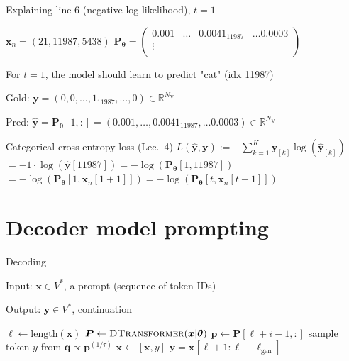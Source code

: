 \documentclass[12pt,aspectratio=169,handout]{beamer}
\begin{document}
\begin{frame}{Explaining line 6 (negative log likelihood), $t = 1$}
	
	\begin{small}
		$\bm{x}_n = (21, 11987, 5438)$
		$
		\bm{P_{\theta}} =
		\begin{pmatrix}
			0.001 & \ldots & 0.0041_{11987} & \ldots 0.0003 \\
			\vdots &  &  &  \\
		\end{pmatrix}
		$
	\end{small}	
	
	For $t = 1$, the model should learn to predict "cat" (idx 11987)
	
	Gold: $\bm{y} = (0, 0, \ldots, 1_{11987}, \ldots, 0) \in \mathbb{R}^{N_{\text{V}}}$
	
	Pred: $\bm{\hat{y}} = \bm{P_{\theta}}[1,:] = (0.001, \ldots, 0.0041_{11987}, \ldots 0.0003) \in \mathbb{R}^{N_{\text{V}}}$
	
	\begin{block}{Categorical cross entropy loss (Lec.\ 4)}
		$L (\bm{\hat{y}, \bm{y}}) := - \sum_{k = 1}^{K} \bm{y}_{[k]} \log \left(  \bm{\hat{y}}_{[k]} \right)$ \\
		$= - 1 \cdot \log (\bm{\hat{y}}[11987])
		= - \log(\bm{P_{\theta}}[1, 11987])$ \\
		$= - \log(\bm{P_{\theta}}[1, \bm{x}_n[1 + 1]]) 
		= - \log(\bm{P_{\theta}}[t, \bm{x}_n[t + 1]])$	
	\end{block}
	
\end{frame}


\section{Decoder model prompting}

\begin{frame}{Decoding}

Input: $\bm{x} \in V^*$, a prompt (sequence of token IDs)

Output: $\bm{y} \in V^*$, continuation

\begin{minipage}[t][10cm][t]{15cm}
	\begin{algorithmic}[1]
		\State $\ell \gets \text{length}(\bm{x})$
		\State $\bm{P} \gets \textsc{DTransformer}(\bm{x} | \bm{\theta})$
		\State $\bm{p} \gets \bm{P}[\ell + i - 1, :]$
		\State sample token $y$ from $\bm{q} \propto \bm{p}^{(1 / \tau)}$
		\State $\bm{x} \gets [\bm{x}, y]$
		\EndFor
		\State \Return $\bm{y} = \bm{x}[\ell + 1: \ell + \ell_{\text{gen}}]$
		\EndFunction
	\end{algorithmic}
	
\end{minipage}



\end{frame}
\end{document}

